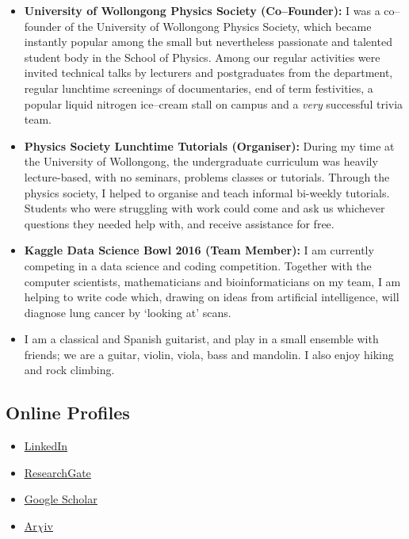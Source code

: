 \documentclass[11pt,a4paper,sans]{moderncv}        %
\begin{document}
{\begin{itemize}
\item{\textbf{University of Wollongong Physics Society (Co--Founder):} I was a co--founder of the University of Wollongong Physics Society, which became instantly popular among the small but nevertheless passionate and talented student body in the School of Physics. Among our regular activities were invited technical talks by lecturers and postgraduates from the department, regular lunchtime screenings of documentaries, end of term festivities, a popular liquid nitrogen ice--cream stall on campus and a \textit{very} successful trivia team.}
\item{\textbf{Physics Society Lunchtime Tutorials (Organiser):} During my time at the University of Wollongong, the undergraduate curriculum was heavily lecture-based, with no seminars, problems classes or tutorials. Through the physics society, I helped to organise and teach informal bi-weekly tutorials. Students who were struggling with work could come and ask us whichever questions they needed help with, and receive assistance for free.}
\item{\textbf{Kaggle Data Science Bowl 2016 (Team Member):} I am currently competing in a data science and coding competition. Together with the computer scientists, mathematicians and bioinformaticians on my team, I am helping to write code which, drawing on ideas from artificial intelligence, will diagnose lung cancer by `looking at' scans.}
\item{I am a classical and Spanish guitarist, and play in a small ensemble with friends; we are a guitar, violin, viola, bass and mandolin. I also enjoy hiking and rock climbing.}
\end{itemize}}

\vspace{5pt}

\subsection{Online Profiles}

\vspace{5pt}

\begin{itemize}
\item{\textcolor{blue}{\underline{\href{http://linkedin.com/in/lachlan-marnham-a463b190}{LinkedIn}}}}

\vspace{6pt}

\item{\textcolor{blue}{\underline{\href{https://www.researchgate.net/profile/Lachlan_Marnham}{ResearchGate}}}}

\vspace{6pt}

\item{\textcolor{blue}{\underline{\href{https://scholar.google.co.uk/citations?user=5Vi60LYAAAAJ&hl=en}{Google Scholar}}}}

\vspace{6pt}

\item{\textcolor{blue}{\underline{\href{http://arxiv.org/a/marnham_l_1.html}{Ar$\chi$iv}}}}
\end{itemize}
\end{document}
